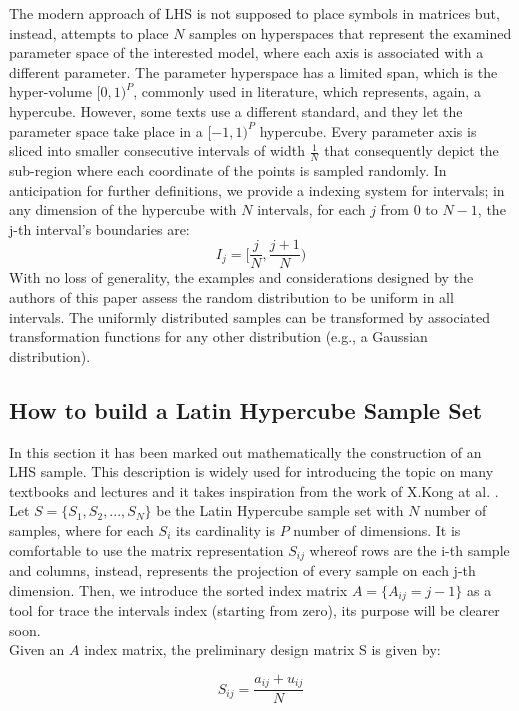 \documentclass{article}
\begin{document}
The modern approach of LHS is not supposed to place symbols in matrices but, instead, attempts to place $N$ samples on hyperspaces that represent the examined parameter space of the interested model, where each axis is associated with a different parameter. The parameter hyperspace has a limited span, which is the hyper-volume $[0,1)^P$, commonly used in literature, which represents, again, a hypercube. However, some texts use a different standard, and they let the parameter space take place in a $[-1,1)^P$ hypercube. Every parameter axis is sliced into smaller consecutive intervals of width $\frac{1}{N}$ that consequently depict the sub-region where each coordinate of the points is sampled randomly. In anticipation for further definitions, we provide a indexing system for intervals; in any dimension of the hypercube with $N$ intervals, for each $j$ from 0 to $N-1$, the j-th interval's boundaries are:
\begin{equation}
\label{eq:interval_index}
I_j = [\frac{j}{N}, \frac{j + 1}{N})
\end{equation}
With no loss of generality, the examples and considerations designed by the authors of this paper assess the random distribution to be uniform in all intervals. The uniformly distributed samples can be transformed by associated transformation functions for any other distribution (e.g., a Gaussian distribution).

\subsection{How to build a Latin Hypercube Sample Set}
In this section it has been marked out mathematically the construction of an LHS sample. This description is widely used for introducing the topic on many textbooks and lectures and it takes inspiration from the work of X.Kong at al. .
Let $S = \{S_1, S_2, ..., S_N\}$ be the Latin Hypercube sample set with $N$ number of samples, where for each $S_i$ its cardinality is $P$ number of dimensions. It is comfortable to use the matrix representation $S_{ij}$ whereof rows are the i-th sample and columns, instead, represents the projection of every sample on each j-th dimension. Then, we introduce the sorted index matrix $A = \{A_{ij} = j - 1\}$ as a tool for trace the intervals index (starting from zero), its purpose will be clearer soon. \\
Given an $A$ index matrix, the preliminary design matrix S is given by: 

\begin{equation}
\label{eq:Sij_def}
S_{ij} = \frac{a_{ij} + u_{ij}}{N}
\end{equation}
\end{document}
